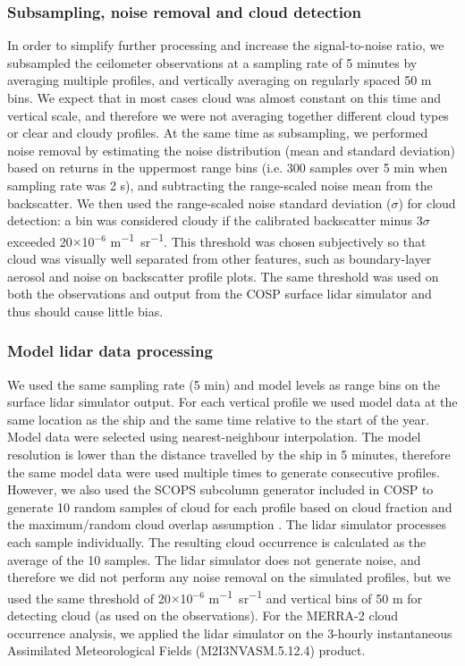 \subsubsection{Subsampling, noise removal and cloud detection}
\label{sec:2:subsampling}

In order to simplify further processing and increase the signal-to-noise ratio,
we subsampled the ceilometer observations at a sampling rate of 5 minutes by
averaging multiple profiles, and vertically averaging on regularly spaced 50
\unit{m} bins. We expect that in most cases cloud was almost constant on this
time and vertical scale, and therefore we were not averaging together different
cloud types or clear and cloudy profiles. At the same time as subsampling, we
performed noise removal by estimating the noise distribution (mean and standard
deviation) based on returns in the uppermost range bins (i.e. 300 samples over 5
min when sampling rate was 2 \unit{s}), and subtracting the range-scaled noise
mean from the backscatter. We then used the range-scaled noise standard
deviation ($\sigma$) for cloud detection: a bin was considered cloudy if the
calibrated backscatter minus 3$\sigma$ exceeded 20$\times$10$^{-6}$ \unit{m^{-1}
sr^{-1}}. This threshold was chosen subjectively so that cloud was visually well
separated from other features, such as boundary-layer aerosol and noise on
backscatter profile plots. The same threshold was used on both the observations
and output from the COSP surface lidar simulator and thus should cause little
bias.

\subsubsection{Model lidar data processing}

We used the same sampling rate (5 min) and model levels as range bins on the
surface lidar simulator output. For each vertical profile we used model data at
the same location as the ship and the same time relative to the start of the
year. Model data were selected using nearest-neighbour interpolation. The model
resolution is lower than the distance travelled by the ship in 5 minutes,
therefore the same model data were used multiple times to generate consecutive
profiles. However, we also used the SCOPS \citep{webb2001} subcolumn generator
included in COSP to generate 10 random samples of cloud for each profile based
on cloud fraction and the maximum/random cloud overlap assumption \citep{cosp}.
The lidar simulator processes each sample individually. The resulting cloud
occurrence is calculated as the average of the 10 samples. The lidar simulator
does not generate noise, and therefore we did not perform any noise removal on
the simulated profiles, but we used the same threshold of 20$\times$10$^{-6}$
\unit{m^{-1} sr^{-1}} and vertical bins of 50 m for detecting cloud (as used on
the observations). For the MERRA-2 cloud occurrence analysis, we applied the
lidar simulator on the 3-hourly instantaneous Assimilated Meteorological Fields
(M2I3NVASM.5.12.4) product.

